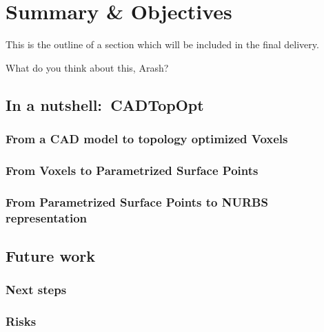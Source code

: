 \chapter{Summary \& Objectives}
This is the outline of a section which will be included in the final delivery. 

What do you think about this, Arash?
\label{chapter:Discussion}

\section{In a nutshell:\ \acl{CADTopOpt}}
\subsection{From a \acs{CAD} model to topology optimized Voxels}
\subsection{From Voxels to Parametrized Surface Points}
\subsection{From Parametrized Surface Points to \ac{NURBS} representation}

\section{Future work}
\subsection{Next steps}
\subsection{Risks}
